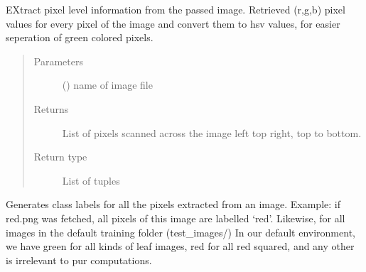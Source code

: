 \documentclass[letterpaper,10pt,english]{sphinxmanual}
\begin{document}

\begin{fulllineitems}
\label{\detokenize{pyleaf.basefunctions:pyleaf.basefunctions.alter_calc}}
EXtract pixel level information from the passed image. Retrieved (r,g,b) pixel values for every pixel of the image and convert them to hsv values,
for easier seperation of green colored pixels.
\begin{quote}\begin{description}
\item[{Parameters}] \leavevmode
{} () \textendash{} name of image file

\item[{Returns}] \leavevmode
List of pixels scanned across the image left top right, top to bottom.

\item[{Return type}] \leavevmode
List of tuples

\end{description}\end{quote}

\end{fulllineitems}


\begin{fulllineitems}
\label{\detokenize{pyleaf.basefunctions:pyleaf.basefunctions.generateClassLabels}}
Generates class labels for all the pixels extracted from an image.
Example: if red.png was fetched, all pixels of this image are labelled ‘red’. Likewise, for all images in the default training folder (test\_images/)
In our default environment, we have green for all kinds of leaf images, red for all red squared, and any other is irrelevant to pur computations.

\end{fulllineitems}

\end{document}
